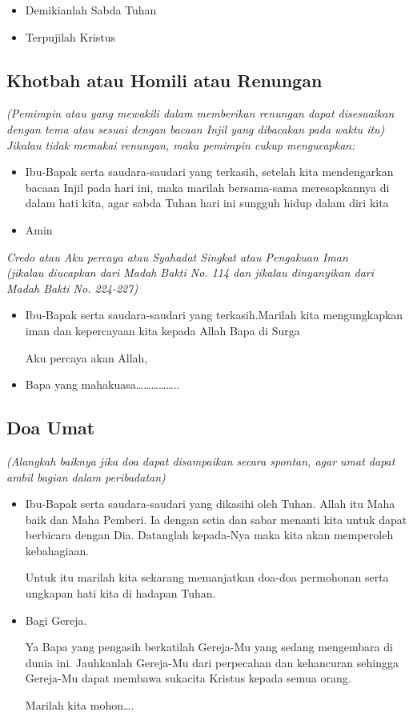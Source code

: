 \documentclass[a4paper,12pt]{article}
\newcommand{\BU}[1]{\begin{itemize} \item[U:] #1 \end{itemize}}
\newcommand{\BP}[1]{\begin{itemize} \item[P:] #1 \end{itemize}}
\begin{document}
\BP{Demikianlah Sabda Tuhan}

\BU{Terpujilah Kristus}

\subsection*{Khotbah atau Homili atau Renungan}

\textit{(Pemimpin atau yang mewakili dalam memberikan renungan dapat disesuaikan dengan tema atau sesuai dengan bacaan Injil
yang dibacakan pada waktu itu)
\\
Jikalau tidak memakai renungan, maka pemimpin cukup mengucapkan:}

\BP{Ibu-Bapak serta saudara-saudari yang terkasih, setelah kita mendengarkan bacaan Injil pada hari ini, maka
marilah bersama-sama meresapkannya di dalam hati kita, agar sabda Tuhan hari ini sungguh hidup dalam diri kita}

\BU{Amin}

\emph{\emph{Credo} atau Aku percaya atau Syahadat Singkat atau Pengakuan Iman
\\
(jikalau diucapkan dari Madah Bakti No. 114 dan jikalau dinyanyikan dari Madah Bakti No. 224-227)}

\BP{Ibu-Bapak serta saudara-saudari yang terkasih.Marilah kita mengungkapkan iman dan kepercayaan
kita kepada Allah Bapa di Surga

Aku percaya akan Allah,}

\BU{Bapa yang mahakuasa{\dots}{\dots}{\dots}{\dots}{\dots}..}

\subsection*{Doa Umat}

\textit{(Alangkah baiknya jika doa dapat disampaikan secara spontan, agar umat dapat ambil bagian dalam peribadatan)}

\BP{Ibu-Bapak serta saudara-saudari yang dikasihi oleh Tuhan. Allah itu Maha baik dan Maha Pemberi. Ia dengan setia dan
sabar menanti kita untuk dapat berbicara dengan Dia. Datanglah kepada-Nya maka kita akan memperoleh kebahagiaan.

Untuk itu marilah kita sekarang memanjatkan doa-doa permohonan serta ungkapan hati kita di hadapan Tuhan.}

\BP{Bagi Gereja.

Ya Bapa yang pengasih berkatilah Gereja-Mu yang sedang mengembara di dunia ini. Jauhkanlah Gereja-Mu dari perpecahan dan
kehancuran sehingga Gereja-Mu dapat membawa sukacita Kristus kepada semua orang.

Marilah kita mohon{\dots}.}
\end{document}
